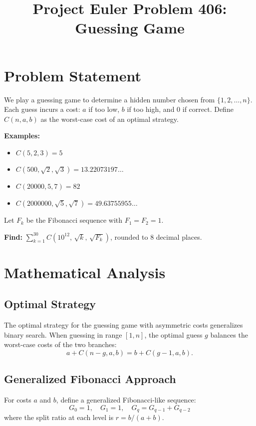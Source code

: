 \documentclass[11pt]{article}
\title{Project Euler Problem 406: Guessing Game}
\author{}
\date{}
\begin{document}
\maketitle

\section{Problem Statement}

We play a guessing game to determine a hidden number chosen from $\{1, 2, \ldots, n\}$.
Each guess incurs a cost: $a$ if too low, $b$ if too high, and $0$ if correct.
Define $C(n, a, b)$ as the worst-case cost of an optimal strategy.

\textbf{Examples:}
\begin{itemize}
  \item $C(5, 2, 3) = 5$
  \item $C(500, \sqrt{2}, \sqrt{3}) = 13.22073197\ldots$
  \item $C(20000, 5, 7) = 82$
  \item $C(2000000, \sqrt{5}, \sqrt{7}) = 49.63755955\ldots$
\end{itemize}

Let $F_k$ be the Fibonacci sequence with $F_1 = F_2 = 1$.

\textbf{Find:} $\displaystyle\sum_{k=1}^{30} C\!\left(10^{12},\, \sqrt{k},\, \sqrt{F_k}\right)$, rounded to 8 decimal places.

\section{Mathematical Analysis}

\subsection{Optimal Strategy}

The optimal strategy for the guessing game with asymmetric costs generalizes binary search.
When guessing in range $[1, n]$, the optimal guess $g$ balances the worst-case costs of the two branches:
\[
  a + C(n - g, a, b) = b + C(g - 1, a, b).
\]

\subsection{Generalized Fibonacci Approach}

For costs $a$ and $b$, define a generalized Fibonacci-like sequence:
\[
  G_0 = 1, \quad G_1 = 1, \quad G_{q} = G_{q-1} + G_{q-2}
\]
where the split ratio at each level is $r = b/(a+b)$.
\end{document}
